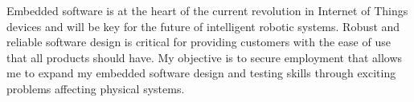 

\begin{cvparagraph}

Embedded software is at the heart of the current revolution in Internet of Things devices and will be key for the future of intelligent robotic systems.
Robust and reliable software design is critical for providing customers with the ease of use that all products should have.
My objective is to secure employment that allows me to expand my embedded software design and testing skills through exciting problems affecting physical systems.

\end{cvparagraph}
